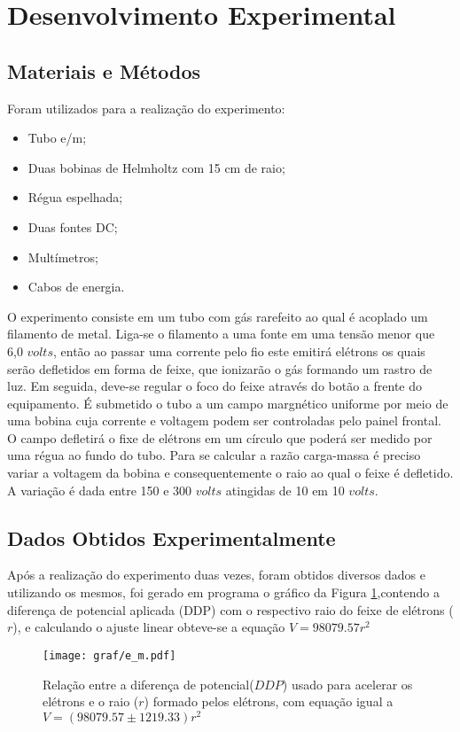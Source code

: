 \section{Desenvolvimento Experimental}
\subsection{Materiais e Métodos}
Foram utilizados para a realização do experimento:
\begin{itemize}
	\item Tubo e/m;
	\item Duas bobinas de Helmholtz com 15 cm de raio;
	\item Régua espelhada;
	\item Duas fontes DC;
	\item Multímetros;
	\item Cabos de energia.
\end{itemize}

O experimento consiste em um tubo com gás rarefeito  ao qual é acoplado um filamento de metal. Liga-se o filamento a uma fonte em uma tensão menor que 6,0 $volts$, então ao passar uma corrente pelo fio este emitirá elétrons os quais serão defletidos em forma de feixe, que ionizarão o gás formando um rastro de luz. Em seguida, deve-se regular o foco do feixe através do botão a frente do equipamento. É submetido o tubo a um campo margnético uniforme por meio de uma bobina cuja corrente e voltagem podem ser controladas pelo painel frontal. O campo defletirá o fixe de elétrons em um círculo que poderá ser medido por uma régua ao fundo do tubo. Para se calcular a razão carga-massa é preciso variar a voltagem da bobina e consequentemente o raio ao qual o feixe é defletido. A variação é dada entre 150 e 300 $volts$ atingidas de 10 em 10 $volts$.

\subsection{Dados Obtidos Experimentalmente}
Após a realização do experimento duas vezes, foram obtidos diversos dados e utilizando os mesmos, foi gerado em programa o gráfico da Figura \ref{fig},contendo a diferença de potencial aplicada (DDP) com o respectivo raio do feixe de elétrons ($r$), e calculando o ajuste linear obteve-se a equação $V = 98079.57r^2 $

\begin{figure}[!ht]
	\centering
		\texttt{[image: graf/e\_m.pdf]}
	\caption{Relação entre a diferença de potencial($DDP$) usado para acelerar os elétrons e o raio ($r$) formado pelos elétrons, com equação igual a $V = (98079.57\pm 1219.33)r^2$}
\label{fig}
\end{figure}

